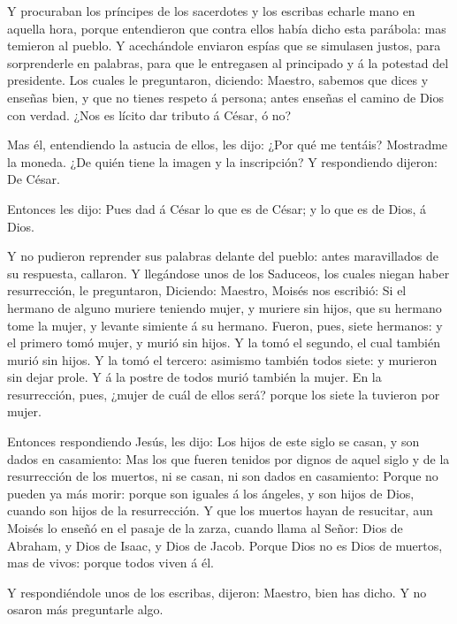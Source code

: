  Y procuraban los príncipes de los sacerdotes y los
escribas echarle mano en aquella hora, porque entendieron que contra
ellos había dicho esta parábola: mas temieron al pueblo.  Y
acechándole enviaron espías que se simulasen justos, para sorprenderle
en palabras, para que le entregasen al principado y á la potestad del
presidente.  Los cuales le preguntaron, diciendo: Maestro,
sabemos que dices y enseñas bien, y que no tienes respeto á persona;
antes enseñas el camino de Dios con verdad.  ¿Nos es lícito
dar tributo á César, ó no?

 Mas él, entendiendo la astucia de ellos, les dijo: ¿Por
qué me tentáis?  Mostradme la moneda. ¿De quién tiene la
imagen y la inscripción? Y respondiendo dijeron: De César.

 Entonces les dijo: Pues dad á César lo que es de César; y
lo que es de Dios, á Dios.

 Y no pudieron reprender sus palabras delante del pueblo:
antes maravillados de su respuesta, callaron.  Y llegándose
unos de los Saduceos, los cuales niegan haber resurrección, le
preguntaron,  Diciendo: Maestro, Moisés nos escribió: Si el
hermano de alguno muriere teniendo mujer, y muriere sin hijos, que su
hermano tome la mujer, y levante simiente á su hermano. 
Fueron, pues, siete hermanos: y el primero tomó mujer, y murió sin
hijos.  Y la tomó el segundo, el cual también murió sin
hijos.  Y la tomó el tercero: asimismo también todos siete:
y murieron sin dejar prole.  Y á la postre de todos murió
también la mujer.  En la resurrección, pues, ¿mujer de cuál
de ellos será? porque los siete la tuvieron por mujer.

 Entonces respondiendo Jesús, les dijo: Los hijos de este
siglo se casan, y son dados en casamiento:  Mas los que
fueren tenidos por dignos de aquel siglo y de la resurrección de los
muertos, ni se casan, ni son dados en casamiento:  Porque
no pueden ya más morir: porque son iguales á los ángeles, y son hijos de
Dios, cuando son hijos de la resurrección.  Y que los
muertos hayan de resucitar, aun Moisés lo enseñó en el pasaje de la
zarza, cuando llama al Señor: Dios de Abraham, y Dios de Isaac, y Dios
de Jacob.  Porque Dios no es Dios de muertos, mas de vivos:
porque todos viven á él.

 Y respondiéndole unos de los escribas, dijeron: Maestro,
bien has dicho.  Y no osaron más preguntarle algo.

